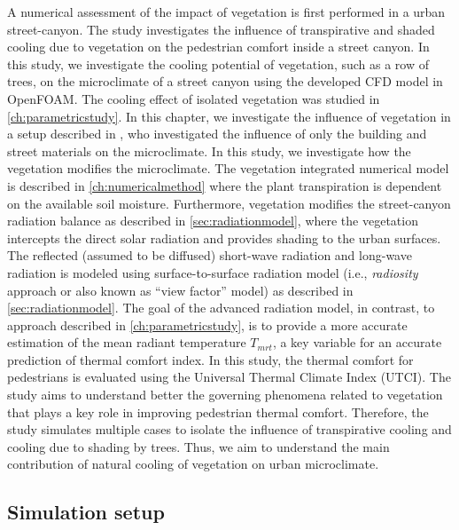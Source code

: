 A numerical assessment of the impact of vegetation is first performed in a urban street-canyon. The study investigates the influence of transpirative and shaded cooling due to vegetation on the pedestrian comfort inside a street canyon. In this study, we investigate the cooling potential of vegetation, such as a row of trees, on the microclimate of a street canyon using the developed CFD model in OpenFOAM. The cooling effect of isolated vegetation was studied in \cref{ch:parametricstudy}. In this chapter, we investigate the influence of vegetation in a setup described in \cite{Kubilay2018}, who investigated the influence of only the building and street materials on the microclimate. In this study,  we investigate how the vegetation modifies the microclimate. The vegetation integrated numerical model is described in \cref{ch:numericalmethod} where the plant transpiration is dependent on the available soil moisture. Furthermore, vegetation modifies the street-canyon radiation balance as described in \cref{sec:radiationmodel}, where the vegetation intercepts the direct solar radiation and provides shading to the urban surfaces. The reflected (assumed to be diffused) short-wave radiation and long-wave radiation is modeled using surface-to-surface radiation model (i.e.,  \textit{radiosity} approach or also known as ``view factor'' model) as described in \cref{sec:radiationmodel}. The goal of the advanced radiation model, in contrast, to approach described in \cref{ch:parametricstudy}, is to provide a more accurate estimation of the mean radiant temperature $T_{\textit{mrt}}$, a key variable for an accurate prediction of thermal comfort index. In this study, the thermal comfort for pedestrians is evaluated using the Universal Thermal Climate Index (UTCI). The study aims to understand better the governing phenomena related to vegetation that plays a key role in improving pedestrian thermal comfort. Therefore, the study simulates multiple cases to isolate the influence of transpirative cooling and cooling due to shading by trees. Thus, we aim to understand the main contribution of natural cooling of vegetation on urban microclimate.  

\subsection{Simulation setup}

